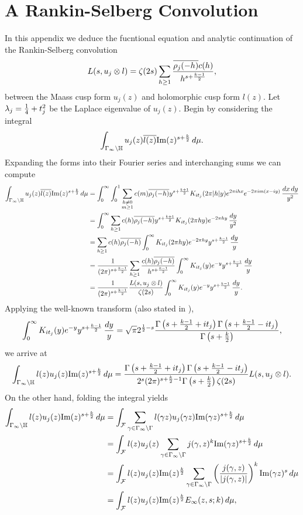 \documentclass[12pt,reqno,oneside]{amsart}
\begin{document}
\section{A Rankin-Selberg Convolution}
  In this appendix we deduce the fucntional equation and analytic continuation of the Rankin-Selberg convolution
  \[
    L(s,u_{j} \otimes l) = \zeta(2s)\sum_{h \ge 1}\frac{\overline{\rho_{j}(-h)}c(h)}{h^{s+\frac{k-1}{2}}},
  \]
  between the Maass cusp form $u_{j}(z)$ and holomorphic cusp form $l(z)$. Let $\lambda_{j} = \frac{1}{4}+t_{j}^{2}$ be the Laplace eigenvalue of $u_{j}(z)$. Begin by considering the integral
  \[
    \int_{\Gamma_{\infty}\backslash\mathbb{H}}u_{j}(z)\overline{l(z)}\mathrm{Im}(z)^{s+\frac{k}{2}}\,d\mu.
  \]
  Expanding the forms into their Fourier series and interchanging sums we can compute
  \begin{align*}
    \int_{\Gamma_{\infty}\backslash\mathbb{H}}u_{j}(z)\overline{l(z)}\mathrm{Im}(z)^{s+\frac{k}{2}}\,d\mu &= \int_{0}^{\infty}\int_{0}^{1}\sum_{\substack{h \neq 0 \\ m \ge 1}}c(m)\overline{\rho_{j}(-h)}y^{s+\frac{k+1}{2}}K_{it_{j}}(2\pi|h|y)e^{2\pi ihx}e^{-2\pi im(x-iy)}\,\frac{dx\,dy}{y^{2}} \\
    &= \int_{0}^{\infty}\sum_{h \ge 1}c(h)\overline{\rho_{j}(-h)}y^{s+\frac{k+1}{2}}K_{it_{j}}(2\pi hy)e^{-2\pi hy}\,\frac{dy}{y^{2}} \\
    &= \sum_{h \ge 1}c(h)\overline{\rho_{j}(-h)}\int_{0}^{\infty}K_{it_{j}}(2\pi hy)e^{-2\pi hy}y^{s+\frac{k-1}{2}}\,\frac{dy}{y} \\
    &= \frac{1}{(2\pi)^{s+\frac{k-1}{2}}}\sum_{h \ge 1}\frac{c(h)\overline{\rho_{j}(-h)}}{h^{s+\frac{k-1}{2}}}\int_{0}^{\infty}K_{it_{j}}(y)e^{-y}y^{s+\frac{k-1}{2}}\,\frac{dy}{y} \\
    &= \frac{1}{(2\pi)^{s+\frac{k-1}{2}}}\frac{L(s,u_{j} \otimes l)}{\zeta(2s)}\int_{0}^{\infty}K_{it_{j}}(y)e^{-y}y^{s+\frac{k-1}{2}}\,\frac{dy}{y}.
  \end{align*}
  Applying the well-known transform (also stated in \cite{HDL}),
  \[
    \int_{0}^{\infty}K_{it_{j}}(y)e^{-y}y^{s+\frac{k-1}{2}}\,\frac{dy}{y} = \sqrt{\pi}2^{\frac{1}{2}-s}\frac{\Gamma\left(s+\frac{k-1}{2}+it_{j}\right)\Gamma\left(s+\frac{k-1}{2}-it_{j}\right)}{\Gamma\left(s+\frac{k}{2}\right)},
  \]
  we arrive at
  \[
    \int_{\Gamma_{\infty}\backslash\mathbb{H}}l(z)u_{j}(z)\mathrm{Im}(z)^{s+\frac{k}{2}}\,d\mu = \frac{\Gamma\left(s+\frac{k-1}{2}+it_{j}\right)\Gamma\left(s+\frac{k-1}{2}-it_{j}\right)}{2^{s}(2\pi)^{s+\frac{k}{2}-1}\Gamma\left(s+\frac{k}{2}\right)\zeta(2s)}L(s,u_{j} \otimes l).
  \]
  On the other hand, folding the integral yields
  \begin{align*}
    \int_{\Gamma_{\infty}\backslash\mathbb{H}}l(z)u_{j}(z)\mathrm{Im}(z)^{s+\frac{k}{2}}\,d\mu &= \int_{\mathcal{F}}\sum_{\gamma \in \Gamma_{\infty}\backslash\Gamma}l(\gamma z)u_{j}(\gamma z)\mathrm{Im}(\gamma z)^{s+\frac{k}{2}}\,d\mu \\
    &= \int_{\mathcal{F}}l(z)u_{j}(z)\sum_{\gamma \in \Gamma_{\infty}\backslash\Gamma}j(\gamma,z)^{k}\mathrm{Im}(\gamma z)^{s+\frac{k}{2}}\,d\mu \\
    &= \int_{\mathcal{F}}l(z)u_{j}(z)\mathrm{Im}(z)^{\frac{k}{2}}\sum_{\gamma \in \Gamma_{\infty}\backslash\Gamma}\left(\frac{j(\gamma,z)}{|j(\gamma,z)|}\right)^{k}\mathrm{Im}(\gamma z)^{s}\,d\mu \\
    &= \int_{\mathcal{F}}l(z)u_{j}(z)\mathrm{Im}(z)^{\frac{k}{2}}E_{\infty}(z,s;k)\,d\mu,
  \end{align*}
\end{document}
